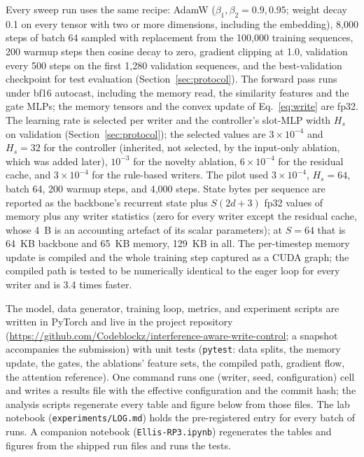 \documentclass[conference]{IEEEtran}
\begin{document}
Every sweep run uses the same recipe: AdamW ($\beta_1, \beta_2 = 0.9, 0.95$;
weight decay 0.1 on every tensor with two or more dimensions, including the
embedding), 8{,}000 steps of batch 64 sampled with replacement from the
100{,}000 training sequences, 200 warmup steps then cosine decay to zero,
gradient clipping at 1.0, validation every 500 steps on the first 1{,}280
validation sequences, and the best-validation checkpoint for test evaluation
(Section~\ref{sec:protocol}). The forward pass runs under bf16 autocast,
including the memory read, the similarity features and the gate MLPs; the
memory tensors and the convex update of Eq.~\eqref{eq:write} are fp32. The
learning rate is selected per writer and the controller's slot-MLP width
$H_s$ on validation (Section~\ref{sec:protocol}); the selected values are
$3 \times 10^{-4}$ and $H_s = 32$ for the controller (inherited, not
selected, by the input-only ablation, which was added later), $10^{-3}$ for
the novelty ablation, $6 \times 10^{-4}$ for the
residual cache, and $3 \times 10^{-4}$ for the rule-based writers. The pilot
used $3 \times 10^{-4}$, $H_s = 64$, batch 64, 200 warmup steps, and 4{,}000
steps. State bytes per sequence are reported as the backbone's recurrent state
plus $S(2d + 3)$ fp32 values of memory plus any writer statistics (zero for
every writer except the residual cache, whose 4~B is an accounting artefact
of its scalar parameters); at $S = 64$ that is 64~KB backbone and 65~KB memory,
129~KB in all. The per-timestep memory update is compiled and the whole
training step captured as a CUDA graph; the compiled path is tested to be
numerically identical to the eager loop for every writer and is 3.4 times
faster.

The model, data generator, training loop, metrics, and experiment scripts are
written in PyTorch and live in the project repository (\url{https://github.com/Codeblockz/interference-aware-write-control}; a
snapshot accompanies the submission) with unit tests (\texttt{pytest}: data
splits, the memory update, the gates, the ablations' feature sets, the
compiled path, gradient flow, the attention reference). One command runs one
(writer, seed, configuration) cell and writes a results file with the
effective configuration and the commit hash; the analysis scripts regenerate
every table and figure below from those files. The lab notebook
(\texttt{experiments/LOG.md}) holds the pre-registered entry for every batch of
runs. A companion notebook (\texttt{Ellis-RP3.ipynb}) regenerates the tables and
figures from the shipped run files and runs the tests.
\end{document}
